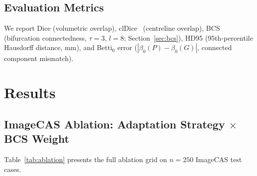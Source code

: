 \documentclass[runningheads]{llncs}
\begin{document}
\subsection{Evaluation Metrics}

We report Dice (volumetric overlap), clDice~\cite{shit_cldice_2021} (centreline overlap), BCS (bifurcation connectedness, $\tau{=}3$, $l{=}8$; Section~\ref{sec:bcs}), HD95 (95th-percentile Hausdorff distance, mm), and Betti$_0$ error ($|\beta_0(P) - \beta_0(G)|$, connected component mismatch).

\section{Results}

\subsection{ImageCAS Ablation: Adaptation Strategy $\times$ BCS Weight}

Table~\ref{tab:ablation} presents the full ablation grid on $n{=}250$ ImageCAS test cases.
\end{document}
